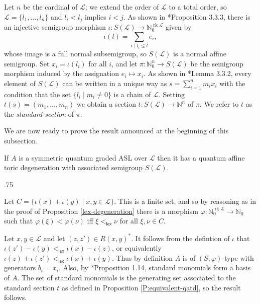 \documentclass[11pt,fleqn]{article}
\makeatletter
\renewenvironment{proof}[1][\textit{Proof}]{\par
  \pushQED{\qed}%
  \normalfont \topsep.75\paraskip\relax
  \trivlist
  \item[\hskip\labelsep
        \itshape
    #1\@addpunct{.}]\ignorespaces
}{%
  \popQED\endtrivlist\@endpefalse
}
\newcommand\NN{\mathbb N}
\renewcommand\to{\longrightarrow}
\renewcommand\phi{\varphi}
\renewcommand\L{\mathcal L}
\DeclareMathOperator\lex{\mathsf{lex}}
\DeclareMathOperator\rk{rk}
\makeatother
\begin{document}
Let $n$ be the cardinal of $\L$; we extend the order of $\L$ to a total order, so $\L =
\{l_1, \ldots, l_n\}$ and $l_i < l_j$ implies $i < j$. As shown in 
\cite{RZ2}*{Proposition 3.3.3}, there is an injective semigroup morphism 
$\iota: S(\L) \to \NN_0^{\rk \L}$ given by
\[
  \iota(l) = \sum_{i \mid l_i \leq l} e_i,
\]
whose image is a full normal subsemigroup, so $S(\L)$ is a normal affine semigroup. 
Set $x_i = \iota(l_i)$ for all $i$, and
let $\pi: \NN_0^n \to S(\L)$ be the semigroup morphism induced by the assignation $e_i
\mapsto x_i$. As shown in \cite{RZ2}*{Lemma 3.3.2}, every element of $S(\L)$ can be 
written in a unique way as $s = \sum_{i=1}^n m_i x_i$ with the condition that the set 
$\{l_i \mid m_i \neq 0\}$ is a chain of $\L$. Setting $t(s) = (m_1, \ldots, m_n)$ we 
obtain a section $t: S(\L) \to \NN^n$ of $\pi$. We refer to $t$ as the \emph{standard 
section} of $\pi$. 

We are now ready to prove the result announced at the beginning of this subsection.
\begin{Theorem} 
\label{T:ASL-are-dominated} 
If $A$ is a symmetric quantum graded ASL over $\L$ then it has a quantum affine toric 
degeneration with associated semigroup $S(\L)$.
\end{Theorem} 
\begin{proof} 
Let $C = \{\iota(x) + \iota(y) \mid x,y \in \L\}$. This is a finite set, and so by 
reasoning as in the proof of Proposition \ref{lex-degeneration} there is a morphism 
$\phi: \NN_0^{\rk \L} \to \NN_0$ such that $\phi(\xi) < \phi(\nu)$ iff $\xi <_{\lex} \nu$
for all $\xi, \nu \in C$. 

Let $x,y \in \L$ and let $(z,z') \in R(x,y)^*$. It follows from the defintion of $\iota$ 
that $\iota(z') - \iota(y) <_{\lex} \iota(x) - \iota(z)$, or equivalently 
$\iota(z) + \iota(z') <_{\lex} \iota(x) + \iota(y)$. Thus by definition $A$ is of 
$(S,\phi)$-type with generators $b_i = x_i$. Also, by \cite{LR1}*{Proposition 1.14},
standard monomials form a basis of $A$. The set of standard monomials is the generating 
set associated to the standard section $t$ as defined in
Proposition \ref{P:equivalent-qatd}, so the result follows.
\end{proof}
\end{document}
